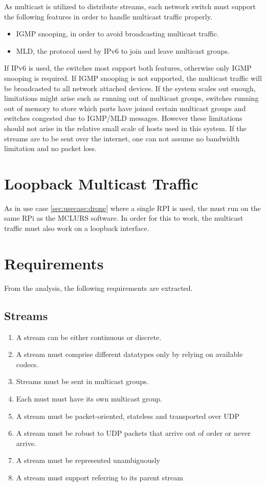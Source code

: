 As multicast is utilized to distribute streams, each network switch must support the following features in order to handle multicast traffic properly.

\begin{itemize}
	 \item IGMP snooping, in order to avoid broadcasting multicast traffic.
	 \item MLD, the protocol used by IPv6 to join and leave multicast groups.
\end{itemize}
If IPv6 is used, the switches most support both features, otherwise only IGMP snooping is required. If IGMP snooping is not supported, the multicast traffic will be broadcasted to all network attached devices.
If the system scales out enough, limitations might arise such as running out of multicast groups, switches running out of memory to store which ports have joined certain multicast groups and switches congested due to IGMP/MLD messages. However these limitations should not arise in the relative small scale of hosts used in this system. If the streams are to be sent over the internet, one can not assume no bandwidth limitation and no packet loss.

\section{Loopback Multicast Traffic} \label{sec:analysis:localmulticasttrafic}
As in use case \ref{sec:usecase:drone} where a single RPI is used, the  must run on the same \ac{RPi} as the \ac{MCLURS} software. In order for this to work, the multicast traffic must also work on a loopback interface.  

\section{Requirements}
From the analysis, the following requirements are extracted.
\subsection{Streams}
\begin{enumerate}
	\item A stream can be either continuous or discrete.
	\item A stream must comprise different datatypes only by relying on available codecs.
    \item Streams must be sent in multicast groups.
    \item Each must must have its own multicast group.
	\item A stream must be packet-oriented, stateless and transported over UDP
	\item A stream must be robust to UDP packets that arrive out of order or never arrive.
	\item A stream must be represented unambiguously
	\item A stream must support referring to its parent stream
\end{enumerate}

